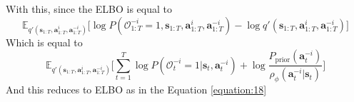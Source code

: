 With this, since the ELBO is equal to 
\begin{equation}
    \mathbb{E}_{q'(\boldsymbol{s}_{1:T}, \boldsymbol{a}^i_{1:T}, \boldsymbol{a}^{-i}_{1:T})}\Bigg[ \log P(\mathcal{O}^{-i}_{1:T} = 1, \boldsymbol{s}_{1:T}, \boldsymbol{a}^i_{1:T}, \boldsymbol{a}^{-i}_{1:T}) - \log q'(\boldsymbol{s}_{1:T}, \boldsymbol{a}^i_{1:T}, \boldsymbol{a}^{-i}_{1:T}) \Bigg]
\end{equation}
Which is equal to 
\begin{equation}
    \mathbb{E}_{q'(\boldsymbol{s}_{1:T}, \boldsymbol{a}^i_{1:T}, \boldsymbol{a}^{-i}_{1:T})}\Bigg[ \sum^T_{t=1} \log P(\mathcal{O}^{-i}_{t} = 1 | \boldsymbol{s}_{t}, \boldsymbol{a}^{-i}_{t}) + \log \frac{P_{\text{prior}}(\boldsymbol{a}^{-i}_t)}{\rho_{\phi}(\boldsymbol{a}^{-i}_t | \boldsymbol{s}_t)}  \Bigg]
\end{equation}
And this reduces to ELBO as in the Equation \ref{equation:18}